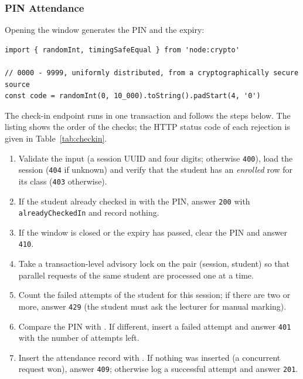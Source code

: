 \subsubsection{PIN Attendance}

Opening the window generates the PIN and the expiry:

\begin{lstlisting}[language=TS, caption={Generation of the PIN (excerpt)}, label={lst:pin}]
import { randomInt, timingSafeEqual } from 'node:crypto'

// 0000 - 9999, uniformly distributed, from a cryptographically secure source
const code = randomInt(0, 10_000).toString().padStart(4, '0')
\end{lstlisting}

The check-in endpoint runs in one transaction and follows the steps below. The listing shows the order of the checks; the HTTP status code of each rejection is given in Table~\ref{tab:checkin}.

\begin{enumerate}
    \item Validate the input (a session UUID and four digits; otherwise \texttt{400}), load the session (\texttt{404} if unknown) and verify that the student has an \emph{enrolled} row for its class (\texttt{403} otherwise).
    \item If the student already checked in with the PIN, answer \texttt{200} with \texttt{alreadyCheckedIn} and record nothing.
    \item If the window is closed or the expiry has passed, clear the PIN and answer \texttt{410}.
    \item Take a transaction-level advisory lock on the pair (session, student) so that parallel requests of the same student are processed one at a time.
    \item Count the failed attempts of the student for this session; if there are two or more, answer \texttt{429} (the student must ask the lecturer for manual marking).
    \item Compare the PIN with . If different, insert a failed attempt and answer \texttt{401} with the number of attempts left.
    \item Insert the attendance record with . If nothing was inserted (a concurrent request won), answer \texttt{409}; otherwise log a successful attempt and answer \texttt{201}.
\end{enumerate}

